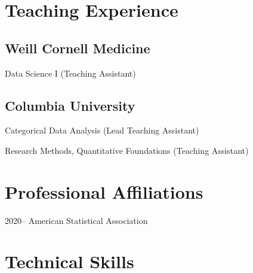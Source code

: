 \documentclass[12pt,letterpaper]{report}
\newcommand{\listitemspace}{0.15em}
\renewenvironment{itemize}
{\begin{list}{}{\setlength{\leftmargin}{0em}
            \setlength{\parskip}{0em}
            \setlength{\itemsep}{\listitemspace}
            \setlength{\parsep}{\listitemspace}}}
    {\end{list}}
\begin{document}
    \section*{Teaching Experience}
    
    \subsection*{Weill Cornell Medicine}
    
    \begin{itemize}
    
    	\item Data Science I \tab (Teaching Assistant)
    
    \end{itemize}

    \subsection*{Columbia University}
    
    \begin{itemize}
    	
    	\item Categorical Data Analysis \tab (Lead Teaching Assistant)
    	\item Research Methods, Quantitative Foundations \tab (Teaching Assistant)
    
    \end{itemize}

    \section*{Professional Affiliations}

    \begin{tablist}

        \item[2020--] \tab American Statistical Association

    \end{tablist}

    \section*{Technical Skills}
\end{document}
